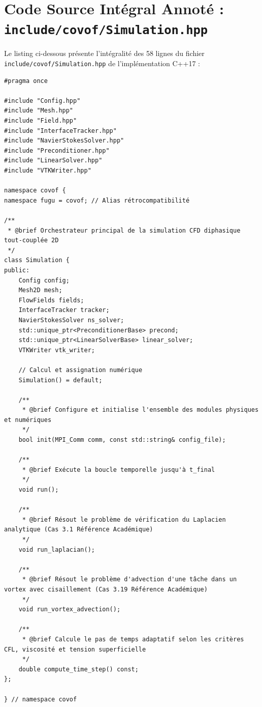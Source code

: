 \documentclass[10pt,a4paper,oneside]{book}
\begin{document}
\section{Code Source Intégral Annoté : \texttt{include/covof/Simulation.hpp}}
Le listing ci-dessous présente l'intégralité des 58 lignes du fichier \texttt{include/covof/Simulation.hpp} de l'implémentation C++17 :

\begin{lstlisting}[language={[11]C++}]
#pragma once

#include "Config.hpp"
#include "Mesh.hpp"
#include "Field.hpp"
#include "InterfaceTracker.hpp"
#include "NavierStokesSolver.hpp"
#include "Preconditioner.hpp"
#include "LinearSolver.hpp"
#include "VTKWriter.hpp"

namespace covof {
namespace fugu = covof; // Alias rétrocompatibilité

/**
 * @brief Orchestrateur principal de la simulation CFD diphasique tout-couplée 2D
 */
class Simulation {
public:
    Config config;
    Mesh2D mesh;
    FlowFields fields;
    InterfaceTracker tracker;
    NavierStokesSolver ns_solver;
    std::unique_ptr<PreconditionerBase> precond;
    std::unique_ptr<LinearSolverBase> linear_solver;
    VTKWriter vtk_writer;

    // Calcul et assignation numérique
    Simulation() = default;

    /**
     * @brief Configure et initialise l'ensemble des modules physiques et numériques
     */
    bool init(MPI_Comm comm, const std::string& config_file);

    /**
     * @brief Exécute la boucle temporelle jusqu'à t_final
     */
    void run();

    /**
     * @brief Résout le problème de vérification du Laplacien analytique (Cas 3.1 Référence Académique)
     */
    void run_laplacian();

    /**
     * @brief Résout le problème d'advection d'une tâche dans un vortex avec cisaillement (Cas 3.19 Référence Académique)
     */
    void run_vortex_advection();

    /**
     * @brief Calcule le pas de temps adaptatif selon les critères CFL, viscosité et tension superficielle
     */
    double compute_time_step() const;
};

} // namespace covof

\end{lstlisting}
\end{document}
